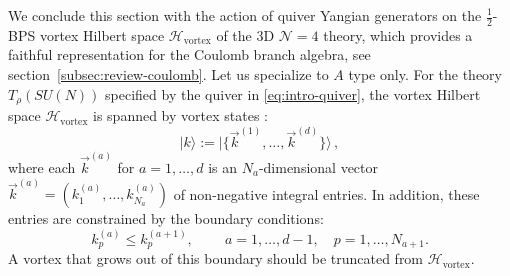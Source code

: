 \documentclass[12pt,a4paper]{article}
\begin{document}
\medskip

We conclude this section with the action of quiver Yangian generators on the $\frac 1 2$-BPS vortex Hilbert space $\mathcal H_{\text{vortex}}$ of the 3D $\mathcal N=4$ theory, which provides a faithful representation for the Coulomb branch algebra, see section~\ref{subsec:review-coulomb}. 
Let us specialize to $A$ type only. For the theory $T_\rho(SU(N))$ specified by the quiver in \eqref{eq:intro-quiver}, the vortex Hilbert space $\mathcal H_{\text{vortex}}$ is spanned by vortex states \cite{BullimoreEtAl2018,ChenLi2026}:
\begin{equation}
    |k\rangle:=|\{\vec{k}^{(1)},\dots,\vec{k}^{(d)}\}\rangle\,,
\end{equation}
where each $\vec{k}^{(a)}$ for $a=1,\dots, d$ is an $N_a$-dimensional vector $\vec{k}^{(a)}=(k^{(a)}_1,\dots,k^{(a)}_{N_a})$ of non-negative integral entries. In addition, these entries are constrained by the boundary conditions:
\begin{equation}\label{eq:bdry-condition}
     k^{(a)}_p\leq k^{(a+1)}_p,\qquad \ a=1,\dots,d-1,\quad p=1,\dots,N_{a+1}.
\end{equation}
A vortex that grows out of this boundary should be truncated from $\mathcal H_{\text{vortex}}$.
\end{document}
